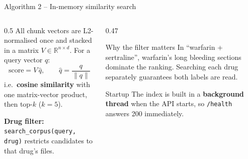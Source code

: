 \documentclass[aspectratio=169,11pt]{beamer}
\begin{document}
\begin{frame}{Algorithm 2 -- In-memory similarity search}
  \begin{columns}[T]
    \begin{column}{0.5\textwidth}
      All chunk vectors are L2-normalised once and stacked in a matrix
      $V \in \mathbb{R}^{n\times d}$. For a query vector $q$:
      \[
        \text{score} = V\,\hat q, \qquad \hat q = \frac{q}{\lVert q\rVert}
      \]
      i.e.\ \textbf{cosine similarity} with one matrix-vector product, then top-$k$ ($k=5$).
      \vspace{0.4em}

      \textbf{Drug filter:} \texttt{search\_corpus(query, drug)} restricts candidates to that drug's files.
    \end{column}
    \begin{column}{0.47\textwidth}
      \begin{block}{Why the filter matters}
        \small
        In ``warfarin + sertraline'', warfarin's long bleeding sections dominate the ranking.
        Searching each drug separately guarantees both labels are read.
      \end{block}
      \vspace{0.4em}
      \begin{block}{Startup}
        \small
        The index is built in a \textbf{background thread} when the API starts,
        so \texttt{/health} answers 200 immediately.
      \end{block}
    \end{column}
  \end{columns}
\end{frame}
\end{document}
